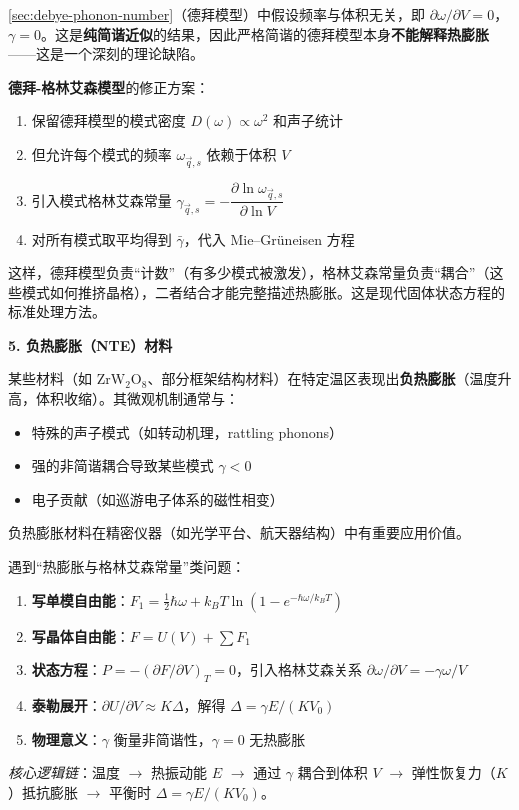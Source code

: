 \begin{insightbox}[物理图像与概念深化]
\ref{sec:debye-phonon-number}（德拜模型）中假设频率与体积无关，即 $\partial\omega/\partial V=0$，$\gamma=0$。这是\textbf{纯简谐近似}的结果，因此严格简谐的德拜模型本身\textbf{不能解释热膨胀}——这是一个深刻的理论缺陷。

\textbf{德拜-格林艾森模型}的修正方案：
\begin{enumerate}
    \item 保留德拜模型的模式密度 $D(\omega)\propto\omega^2$ 和声子统计
    \item 但允许每个模式的频率 $\omega_{\vec q,s}$ 依赖于体积 $V$
    \item 引入模式格林艾森常量 $\gamma_{\vec q,s}=-\dfrac{\partial\ln\omega_{\vec q,s}}{\partial\ln V}$
    \item 对所有模式取平均得到 $\bar\gamma$，代入 Mie--Gr\"uneisen 方程
\end{enumerate}

这样，德拜模型负责``计数''（有多少模式被激发），格林艾森常量负责``耦合''（这些模式如何推挤晶格），二者结合才能完整描述热膨胀。这是现代固体状态方程的标准处理方法。

\textbf{5. 负热膨胀（NTE）材料}

某些材料（如 $\mathrm{ZrW_2O_8}$、部分框架结构材料）在特定温区表现出\textbf{负热膨胀}（温度升高，体积收缩）。其微观机制通常与：
\begin{itemize}
    \item 特殊的声子模式（如转动机理，rattling phonons）
    \item 强的非简谐耦合导致某些模式 $\gamma<0$
    \item 电子贡献（如巡游电子体系的磁性相变）
\end{itemize}

负热膨胀材料在精密仪器（如光学平台、航天器结构）中有重要应用价值。
\end{insightbox}

\begin{thinkbox}
遇到``热膨胀与格林艾森常量''类问题：
\begin{enumerate}
    \item \textbf{写单模自由能}：$F_1=\tfrac{1}{2}\hbar\omega+k_BT\ln(1-e^{-\hbar\omega/k_BT})$
    \item \textbf{写晶体自由能}：$F=U(V)+\sum F_1$
    \item \textbf{状态方程}：$P=-(\partial F/\partial V)_T=0$，引入格林艾森关系 $\partial\omega/\partial V=-\gamma\omega/V$
    \item \textbf{泰勒展开}：$\partial U/\partial V\approx K\Delta$，解得 $\Delta=\gamma E/(KV_0)$
    \item \textbf{物理意义}：$\gamma$ 衡量非简谐性，$\gamma=0$ 无热膨胀
\end{enumerate}
\textit{核心逻辑链}：温度 $\to$ 热振动能 $E$ $\to$ 通过 $\gamma$ 耦合到体积 $V$ $\to$ 弹性恢复力（$K$）抵抗膨胀 $\to$ 平衡时 $\Delta=\gamma E/(KV_0)$。
\end{thinkbox}
